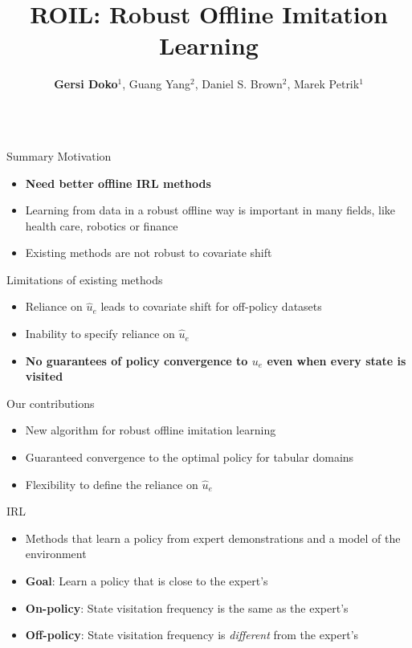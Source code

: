 \documentclass[final,a0paper]{beamer}
\title{ROIL\@: Robust Offline Imitation Learning}
\author[]{\textbf{Gersi Doko$^{1}$}, Guang Yang$^{2}$, Daniel S. Brown$^{2}$, Marek Petrik$^{1}$}
\institute{$^{1}$University of New Hampshire, $^{2}$University of Utah}
\begin{document}
\begin{frame}{}
\vspace{-2cm}
\begin{columns}[t]
  \begin{column}{0.3\linewidth}
    \begin{block}{Summary}
    \alert{Motivation}
    \begin{itemize}
        \item \textbf{Need better offline IRL methods}
        \item Learning from data in a robust offline way is important in many fields, like health care, robotics or finance
        \item Existing methods are not robust to covariate shift
    \end{itemize}
    \alert{Limitations of existing  methods}
    \begin{itemize}
        \item Reliance on $\hat{u}_e$ leads to covariate shift for off-policy datasets
        \item Inability to specify reliance on $\hat{u}_e$
        \item \textbf{No guarantees of policy convergence to $u_e$ even when every state is visited}
    \end{itemize}
    \alert{Our contributions}
    \begin{itemize}
        \item New algorithm for robust offline imitation learning
        \item Guaranteed convergence to the optimal policy for tabular domains
        \item Flexibility to define the reliance on $\hat{u}_e$
    \end{itemize}
    \end{block}

    \begin{block}{IRL}
        \begin{itemize}
            \item Methods that learn a policy from expert demonstrations and a model of the environment
            \item \textbf{Goal}: Learn a policy that is close to the expert's
            \item \textbf{On-policy}: State visitation frequency is the same as the expert's
            \item \textbf{Off-policy}: State visitation frequency is \emph{different} from the expert's
        \end{itemize}
    \end{block}


\end{column}
\end{columns}
\end{frame}
\end{document}

